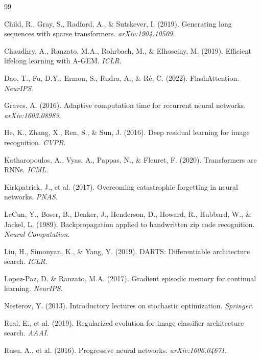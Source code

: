 \documentclass[11pt,a4paper]{article}
\theoremstyle{plain}
\theoremstyle{definition}
\theoremstyle{remark}
\begin{document}

\begin{thebibliography}{99}

Child, R., Gray, S., Radford, A., \& Sutskever, I. (2019). Generating long sequences with sparse transformers. \textit{arXiv:1904.10509}.

Chaudhry, A., Ranzato, M.A., Rohrbach, M., \& Elhoseiny, M. (2019). Efficient lifelong learning with A-GEM. \textit{ICLR}.

Dao, T., Fu, D.Y., Ermon, S., Rudra, A., \& Ré, C. (2022). FlashAttention. \textit{NeurIPS}.

Graves, A. (2016). Adaptive computation time for recurrent neural networks. \textit{arXiv:1603.08983}.

He, K., Zhang, X., Ren, S., \& Sun, J. (2016). Deep residual learning for image recognition. \textit{CVPR}.

Katharopoulos, A., Vyas, A., Pappas, N., \& Fleuret, F. (2020). Transformers are RNNs. \textit{ICML}.

Kirkpatrick, J., et al. (2017). Overcoming catastrophic forgetting in neural networks. \textit{PNAS}.

LeCun, Y., Boser, B., Denker, J., Henderson, D., Howard, R., Hubbard, W., \& Jackel, L. (1989). Backpropagation applied to handwritten zip code recognition. \textit{Neural Computation}.

Liu, H., Simonyan, K., \& Yang, Y. (2019). DARTS: Differentiable architecture search. \textit{ICLR}.

Lopez-Paz, D. \& Ranzato, M.A. (2017). Gradient episodic memory for continual learning. \textit{NeurIPS}.

Nesterov, Y. (2013). Introductory lectures on stochastic optimization. \textit{Springer}.

Real, E., et al. (2019). Regularized evolution for image classifier architecture search. \textit{AAAI}.

Rusu, A., et al. (2016). Progressive neural networks. \textit{arXiv:1606.04671}.


\end{thebibliography}
\end{document}

